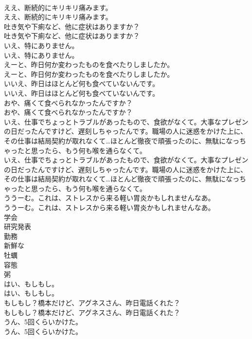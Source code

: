 \documentclass[8pt]{extreport}
\begin{document}
\begin{CJK}{UTF8}{min}
\\	ええ、断続的にキリキリ痛みます。	
\\	ええ、断続的にキリキリ痛みます。 
\\	吐き気や下痢など、他に症状はありますか？	
\\	吐き気や下痢など、他に症状はありますか？ 
\\	いえ、特にありません。	
\\	いえ、特にありません。 
\\	えーと、昨日何か変わったものを食べたりしましたか。	
\\	えーと、昨日何か変わったものを食べたりしましたか。 
\\	いいえ、昨日はほとんど何も食べていないんです。	
\\	いいえ、昨日はほとんど何も食べていないんです。 
\\	おや、痛くて食べられなかったんですか？	
\\	おや、痛くて食べられなかったんですか？ 
\\	いえ、仕事でちょっとトラブルがあったもので、食欲がなくて。大事なプレゼンの日だったんですけど、遅刻しちゃったんです。職場の人に迷惑をかけた上に、その仕事は結局契約が取れなくて…ほとんど徹夜で頑張ったのに、無駄になっちゃったと思ったら、もう何も喉を通らなくて。	
\\	いえ、仕事でちょっとトラブルがあったもので、食欲がなくて。大事なプレゼンの日だったんですけど、遅刻しちゃったんです。職場の人に迷惑をかけた上に、その仕事は結局契約が取れなくて…ほとんど徹夜で頑張ったのに、無駄になっちゃったと思ったら、もう何も喉を通らなくて。 
\\	ううーむ。これは、ストレスから来る軽い胃炎かもしれませんなあ。	
\\	ううーむ。これは、ストレスから来る軽い胃炎かもしれませんなあ。 
\\	学会
\\	研究発表
\\	勤務
\\	新鮮な
\\	牡蠣
\\	容態
\\	粥
\\	はい、もしもし。	
\\	はい、もしもし。 
\\	もしもし？橋本だけど、アグネスさん、昨日電話くれた？	
\\	もしもし？橋本だけど、アグネスさん、昨日電話くれた？ 
\\	うん、5回くらいかけた。	
\\	うん、5回くらいかけた。 

\end{CJK}
\end{document}
